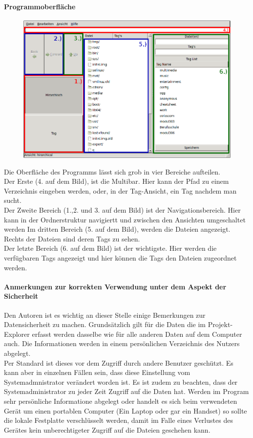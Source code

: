 \documentclass[10pt,paper=a4,final]{scrartcl}
\begin{document}
\paragraph{Programmoberfl\"ache}
\begin{figure}[h!]
\includegraphics[scale=0.5]{erlaeuterungen_gui.png}
\end{figure}
Die Oberfl\"ache des Programms l\"asst sich grob in vier Bereiche aufteilen.\\
Der Erste (4. auf dem Bild), ist die Multibar. Hier kann der Pfad zu einem Verzeichnis eingeben werden, oder, in der Tag-Ansicht, ein Tag nachdem man sucht.\\
Der Zweite Bereich (1.,2. und 3. auf dem Bild) ist der Navigationsbereich. Hier kann in der Ordnerstruktur navigiertt und zwischen den Ansichten umgeschaltet werden Im dritten Bereich (5. auf dem Bild), werden die Dateien angezeigt. Rechts der Dateien sind deren Tags zu sehen.\\
Der letzte Bereich (6. auf dem Bild) ist der wichtigste. Hier werden die verf\"ugbaren Tags angezeigt und hier k\"onnen die Tags den Dateien zugeordnet werden.\\
\paragraph{Anmerkungen zur korrekten Verwendung unter dem Aspekt der Sicherheit}
Den Autoren ist es wichtig an dieser Stelle einige Bemerkungen zur Datensicherheit zu machen.
Grunds\"atzlich gilt f\"ur die Daten die im Projekt-Explorer erfasst werden dasselbe wie f\"ur alle anderen Daten auf dem Computer auch. Die Informationen werden in einem pers\"onlichen Verzeichnis des Nutzers abgelegt.\\
Per Standard ist dieses vor dem Zugriff durch andere Benutzer gesch\"utzt. Es kann aber in einzelnen F\"allen sein, dass diese Einstellung vom Systemadmnistrator ver\"andert worden ist.
Es ist zudem zu beachten, dass der Systemadministrator zu jeder Zeit Zugriff auf die Daten hat.
Werden im Program sehr pers\"onliche Informatione abgelegt oder handelt es sich beim verwendeten Ger\"at um einen portablen Computer (Ein Laptop oder gar ein Handset) so sollte die lokale Festplatte verschl\"usselt werden, damit im Falle eines Verlustes des Ger\"ates kein unberechtigeter Zugriff auf die Dateien geschehen kann.
\end{document}
